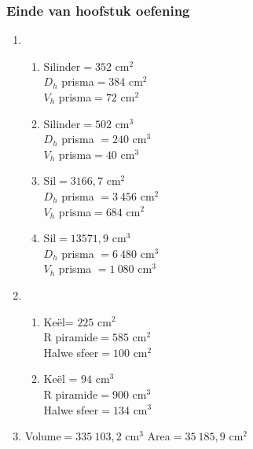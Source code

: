 {\begin{multicols}{3}
\subsubsection*{Einde van hoofstuk oefening} %
\begin{enumerate}[noitemsep, label=\textbf{\arabic*}. ] 
\item %
      \begin{enumerate}[noitemsep, label=\textbf{(\alph*)} ]
	  \item Silinder$ = 352$ cm$^2$\\  $D_h$ prisma$= 384$ cm$^2$\\ $V_h$ prisma$ = 72$ cm$^2$%
	  \item Silinder$ = 502$ cm$^3$\\ $D_h$ prisma $= 240$ cm$^3$\\ $V_h$ prisma$ = 40$ cm$^3$ %
\item Sil$=3166,7$ cm$^2$\\ $D_h$ prisma $=3~456$ cm$^2$\\ $V_h$ prisma$=684$ cm$^2$%
\item Sil$=13571,9$ cm$^3$\\ $D_h$ prisma $=6~480$ cm$^3$\\ $V_h$ prisma $=1~080$ cm$^3$ %
      \end{enumerate}
\item %
      \begin{enumerate}[noitemsep, label=\textbf{(\alph*)} ]
	  \item Ke\"el= $225$ cm$^2$\\R piramide$= 585$ cm$^2$\\Halwe sfeer$= 100$ cm$^2$%
	  \item Ke\"el = $94$ cm$^3$\\R piramide$= 900$ cm$^3$ \\Halwe sfeer$= 134$ cm$^3$ %
      \end{enumerate}
\item Volume$=335~103,2$ cm$^3$ Area$=35~185,9$ cm$^2$%
\end{enumerate}
\end{multicols}

}
